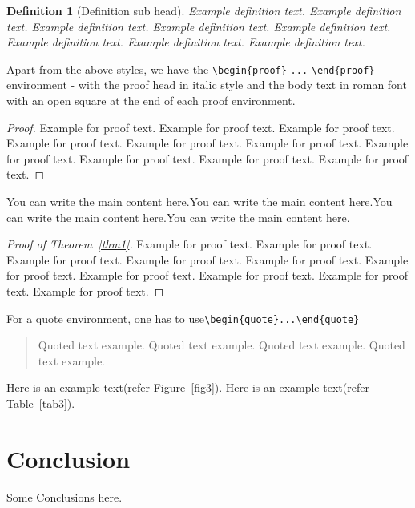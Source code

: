 \documentclass[namedate,webpdf,contemporary,large]{TBench-template}%
\theoremstyle{thmstyleone}%
\theoremstyle{thmstyletwo}%
\theoremstyle{thmstylethree}%
\newtheorem{definition}{Definition}
\begin{document}
\begin{definition}[Definition sub head]
Example definition text. Example definition text. Example definition text. Example definition text. Example definition text. Example definition text. Example definition text. Example definition text.
\end{definition}

Apart from the above styles, we have the \verb+\begin{proof}+ \verb+...+ \verb+\end{proof}+ environment - with the proof head in italic style and the body text in roman font with an open square at the end of each proof environment.

\begin{proof}Example for proof text. Example for proof text. Example for proof text. Example for proof text. Example for proof text. Example for proof text. Example for proof text. Example for proof text. Example for proof text. Example for proof text.
\end{proof}

You can write the main content here.You can write the main content here.You can write the main content here.You can write the main content here.

\begin{proof}[Proof of Theorem~{\upshape\ref{thm1}}]
Example for proof text. Example for proof text. Example for proof text. Example for proof text. Example for proof text. Example for proof text. Example for proof text. Example for proof text. Example for proof text. Example for proof text.
\end{proof}

\noindent
For a quote environment, one has to use\newline \verb+\begin{quote}...\end{quote}+
\begin{quote}
Quoted text example. Quoted text example. Quoted text example. Quoted text example. 
\end{quote}
Here is an example text(refer Figure~\ref{fig3}). Here is an example text(refer Table~\ref{tab3}).

\section{Conclusion}

Some Conclusions here.

\end{document}
